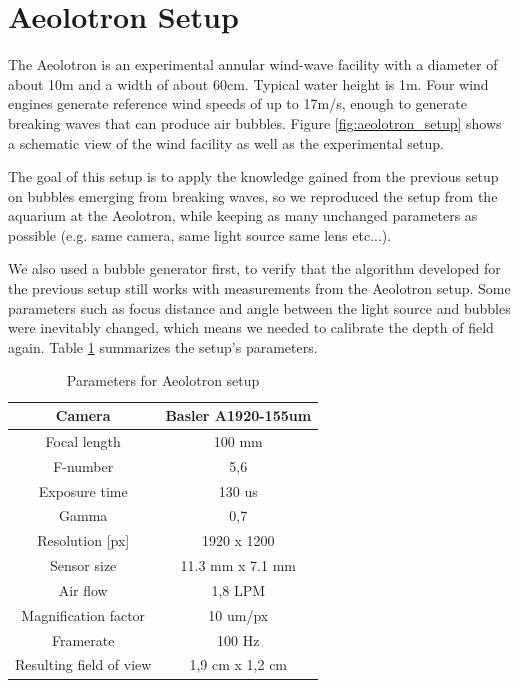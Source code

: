 	\section{Aeolotron Setup}
		The Aeolotron is an experimental annular wind-wave facility with a diameter of about 10m and a width of about 60cm. Typical water height is 1m. Four wind engines generate reference wind speeds of up to 17m/s, enough to generate breaking waves that can produce air bubbles. Figure \ref{fig:aeolotron_setup} shows a schematic view of the wind facility as well as the experimental setup.
		
		The goal of this setup is to apply the knowledge gained from the previous setup on bubbles emerging from breaking waves, so we reproduced the setup from the aquarium at the Aeolotron, while keeping as many unchanged parameters as possible (e.g. same camera, same light source same lens etc...).
		
	We also used a bubble generator first, to verify that the algorithm developed for the previous setup still works with measurements from the Aeolotron setup. Some parameters such as focus distance and angle between the light source and bubbles were inevitably changed, which means we needed to calibrate the depth of field again. Table \ref{tab:aeolotron_setup} summarizes the setup's parameters.
	
		\begin{table}
			\centering
		
			\begin{tabular}{|c|c|}
			\hline 
			Camera & Basler A1920-155um \\ 
			\hline 
			Focal length & 100 mm \\ 
			\hline 
			F-number & 5,6 \\ 
			\hline 
			Exposure time & 130 us \\ 
			\hline 
			Gamma & 0,7 \\
			\hline
			Resolution [px] &1920 x 1200 \\
			\hline 
			Sensor size & 11.3 mm x 7.1 mm \\
			\hline
			Air flow & 1,8 LPM  \\ 
			\hline 
			Magnification factor & 10 um/px \\ 
			\hline 
			Framerate & 100 Hz \\ 
			\hline 
			Resulting field of view & 1,9 cm x 1,2 cm \\
			\hline
			\end{tabular} 
			
			\caption{Parameters for Aeolotron setup}
			\label{tab:aeolotron_setup}

		\end{table}
		
